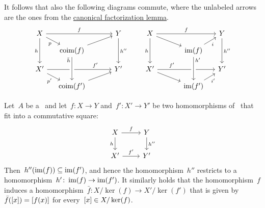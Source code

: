 \begin{remark*}
\begin{enumerate}
      It follows that also the following diagrams commute, where the unlabeled arrows are the ones from the \hyperref[canonical factorization]{canonical factorization lemma}.
      \[
        \begin{tikzcd}[sep = small]
            X
            \arrow{rrr}[above]{f}
            \arrow{dr}[below left]{p}
            \arrow{dd}[left]{h}
          & {}
          & {}
          & Y
            \arrow{dd}[right]{h''}
          \\
            {}
          & \coim(f)
            \arrow{urr}
          & {}
          & {}
          \\
            X'
            \arrow{rrr}[above, near end]{f'}
            \arrow{dr}[below left]{p'}
          & {}
          & {}
          & Y'
          \\
            {}
          & \coim(f')
            \arrow[from=uu, crossing over, "\bar{h}", swap, very near start]
            \arrow{urr}
          & {}
          & {}
        \end{tikzcd}
        \quad\quad
        \begin{tikzcd}[sep = small]
            X
            \arrow{rrr}[above]{f}
            \arrow{drr}
            \arrow{dd}[left]{h}
          & {}
          & {}
          & Y
            \arrow{dd}[right]{h''}
          \\
            {}
          & {}
          & \im(f)
            \arrow{ur}[below right]{i}
          & {}
          \\
            X'
            \arrow{rrr}[above, near start]{f'}
            \arrow{drr}
          & {}
          & {}
          & Y'
          \\
            {}
          & {}
          & \im(f')
            \arrow[from=uu, crossing over, "h'", right, very near start]
            \arrow{ur}[below right]{i'}
          & {}
        \end{tikzcd}
      \]
  \end{enumerate}
\end{remark*}


\begin{example*}
  Let~$A$ be a~{\kalg} and let~$f \colon X \to Y$ and~$f' \colon X' \to Y'$ be two homomorphisms of~{} that fit into a commutative square:
  \[
    \begin{tikzcd}
        X
        \arrow{r}[above]{f}
        \arrow{d}[left]{h}
      & Y
        \arrow{d}[right]{h''}
      \\
        X'
        \arrow{r}[above]{f'}
      & Y'
    \end{tikzcd}
  \]
  Then~$h''(\operatorname{im}(f)) \subseteq \operatorname{im}(f')$, and hence the homomorphism~$h''$ restricts to a homomorphism~$h' \colon \operatorname{im}(f) \to \operatorname{im}(f')$.
  It similarly holds that the homomorphism~$f$ induces a {\welldef} homomorphism~$\bar{f} \colon X/\ker(f) \to X'/\ker(f')$ that is given by~$\bar{f}([x]) = [f(x)]$ for every~$[x] \in X/\ker(f)$.
\end{example*}




